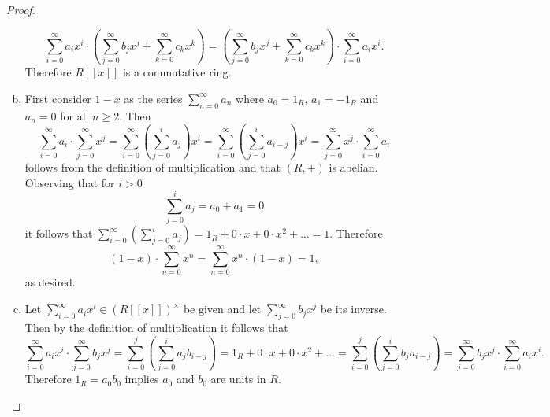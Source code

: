 \documentclass[10pt]{amsart}
\begin{document}
\begin{thm}
\begin{proof}
\begin{enumerate}[(a)]
      $$\sum_{i=0}^\infty a_ix^i \cdot \left(\sum_{j=0}^\infty b_jx^j + \sum_{k=0}^\infty c_kx^k \right) = \left(\sum_{j=0}^\infty b_jx^j + \sum_{k=0}^\infty c_kx^k \right) \cdot \sum_{i=0}^\infty a_ix^i.$$
      Therefore $R[[x]]$ is a commutative ring.
    \item
      First consider $1 - x$ as the series $\sum_{n=0}^\infty a_n$ where $a_0 = 1_R$, $a_1 = -1_R$ and $a_n = 0$ for all $n \geq 2$.
      Then 
      $$\sum_{i=0}^\infty a_i \cdot \sum_{j = 0}^\infty x^j = \sum_{i=0}^\infty\left(\sum_{j=0}^i a_j\right)x^i = \sum_{i=0}^\infty\left(\sum_{j=0}^i a_{i-j}\right)x^i = \sum_{j = 0}^\infty x^j \cdot \sum_{i=0}^\infty a_i$$
       follows from the definition of multiplication and that $(R, +)$ is abelian.
      Observing that for $i > 0$
      \begin{equation*}
        \sum_{j=0}^i a_j = a_0 + a_1 = 0
      \end{equation*}
      it follows that $\sum_{i=0}^\infty\left(\sum_{j=0}^i a_j\right) = 1_R + 0\cdot x + 0 \cdot x^2 + \ldots = 1$.
      Therefore $$(1 - x) \cdot \sum_{n = 0}^\infty x^n = \sum_{n = 0}^\infty x^n \cdot (1 - x) = 1,$$ as desired.
    \item
      Let $\sum_{i=0}^\infty a_ix^i \in (R[[x]])^\times$ be given and let $\sum_{j=0}^\infty b_jx^j$ be its inverse.
      Then by the definition of multiplication it follows that
      $$\sum_{i=0}^\infty a_ix^i \cdot \sum_{j=0}^\infty b_jx^j = \sum_{i=0}^j\left(\sum_{j=0}^i a_jb_{i-j}\right) = 1_R + 0\cdot x + 0\cdot x^2 + \ldots = \sum_{i=0}^j\left(\sum_{j=0}^i b_j a_{i-j}\right) = \sum_{j=0}^\infty b_jx^j \cdot \sum_{i=0}^\infty a_ix^i.$$
      Therefore $1_R = a_0b_0$ implies $a_0$ and $b_0$ are units in $R$.
      

\end{enumerate}
\end{proof}
\end{thm}
\end{document}
